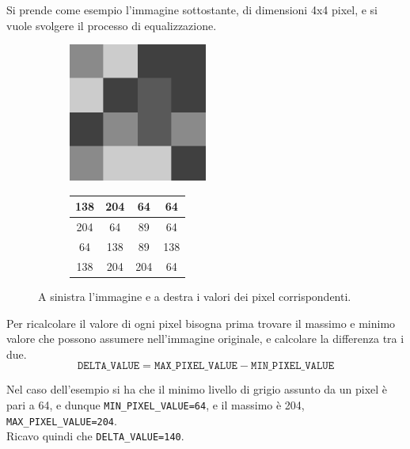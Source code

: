 \documentclass[11pt]{article}
\begin{document}
    Si prende come esempio l'immagine sottostante, di dimensioni 4x4 pixel, e si vuole svolgere il processo di equalizzazione.
    
    \renewcommand{\arraystretch}{1.9}
    \begin{figure}[h]
        \centering
        \begin{subfigure}{0.45\textwidth}
            \centering
            \includegraphics[width=0.5\textwidth]{example-small.png}
        \end{subfigure}
        \begin{subfigure}{0.45\textwidth}
            \centering
            \begin{tabular}{ |c|c|c|c| }
                \hline
                138 & 204 & 64 & 64\\
                \hline
                204 & 64 & 89 & 64\\
                \hline
                64 & 138 & 89 & 138\\
                \hline
                138 & 204 & 204 & 64\\
                \hline
            \end{tabular}
        \end{subfigure}
        
        \caption{A sinistra l'immagine e a destra i valori dei pixel corrispondenti.}
    
    \end{figure}
    
    Per ricalcolare il valore di ogni pixel bisogna prima trovare il massimo e minimo valore che possono assumere nell'immagine originale, e calcolare la differenza tra i due.\\
    $$\mathtt{
    DELTA\_VALUE = MAX\_PIXEL\_VALUE - MIN\_PIXEL\_VALUE
    }$$
    
    Nel caso dell'esempio si ha che il minimo livello di grigio assunto da un pixel è pari a 64, e dunque \texttt{MIN\_PIXEL\_VALUE=64}, e il massimo è 204, \texttt{MAX\_PIXEL\_VALUE=204}.\\
    Ricavo quindi che \texttt{DELTA\_VALUE=140}.
    
\end{document}
